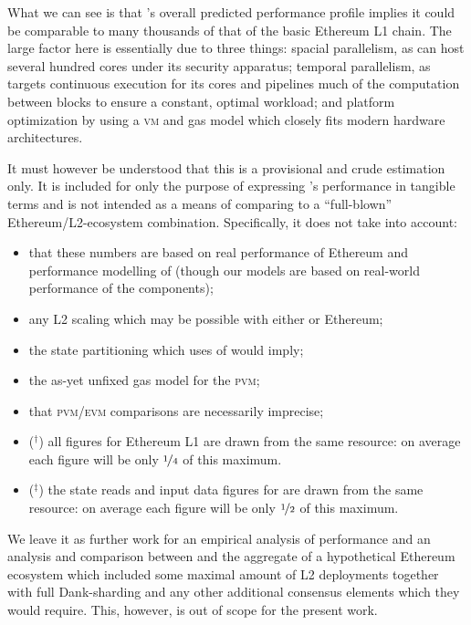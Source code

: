 What we can see is that \Jam's overall predicted performance profile implies it could be comparable to many thousands of that of the basic Ethereum L1 chain. The large factor here is essentially due to three things: spacial parallelism, as \Jam can host several hundred cores under its security apparatus; temporal parallelism, as \Jam targets continuous execution for its cores and pipelines much of the computation between blocks to ensure a constant, optimal workload; and platform optimization by using a \textsc{vm} and gas model which closely fits modern hardware architectures.

It must however be understood that this is a provisional and crude estimation only. It is included for only the purpose of expressing \Jam's performance in tangible terms and is not intended as a means of comparing to a ``full-blown'' Ethereum/L2-ecosystem combination. Specifically, it does not take into account:
\begin{itemize}
  \item that these numbers are based on real performance of Ethereum and performance modelling of \Jam (though our models are based on real-world performance of the components);
  \item any L2 scaling which may be possible with either \Jam or Ethereum;
  \item the state partitioning which uses of \Jam would imply;
  \item the as-yet unfixed gas model for the \textsc{pvm};
  \item that \textsc{pvm}/\textsc{evm} comparisons are necessarily imprecise;
  \item (${}^\dagger$) all figures for Ethereum L1 are drawn from the same resource: on average each figure will be only $\nicefrac{1}{4}$ of this maximum.
  \item (${}^\ddagger$) the state reads and input data figures for \Jam are drawn from the same resource: on average each figure will be only $\nicefrac{1}{2}$ of this maximum.
\end{itemize}

We leave it as further work for an empirical analysis of performance and an analysis and comparison between \Jam and the aggregate of a hypothetical Ethereum ecosystem which included some maximal amount of L2 deployments together with full Dank-sharding and any other additional consensus elements which they would require. This, however, is out of scope for the present work.

